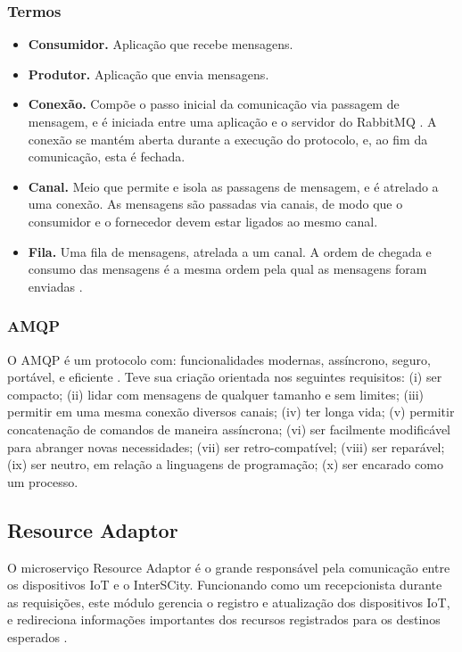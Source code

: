 \subsubsection{Termos}
\begin{itemize}
\item \textbf{Consumidor.} Aplicação que recebe mensagens.
\item \textbf{Produtor.} Aplicação que envia mensagens.
\item \textbf{Conexão.} Compõe o passo inicial da comunicação via passagem
de mensagem, e é iniciada entre uma aplicação e o servidor do
RabbitMQ \cite{amqp2008}. A conexão se mantém aberta durante a execução do
protocolo, e, ao fim da comunicação, esta é fechada.
\item \textbf{Canal.} Meio que permite e isola as passagens de mensagem, e é
atrelado a uma conexão. As mensagens são passadas via canais, de modo que
o consumidor e o fornecedor devem estar ligados ao mesmo canal.
\item \textbf{Fila.} Uma fila de mensagens, atrelada a um canal. A ordem de
chegada e consumo das mensagens é a mesma ordem pela qual as mensagens foram
enviadas \cite{amqp2008}.
\end{itemize}

\subsubsection{AMQP}

O AMQP é um protocolo com: funcionalidades modernas, assíncrono, seguro,
portável, e eficiente \cite{amqp2008}. Teve sua criação orientada nos seguintes
requisitos:
(i) ser compacto;
(ii) lidar com mensagens de qualquer tamanho e sem limites;
(iii) permitir em uma mesma conexão diversos canais;
(iv) ter longa vida;
(v) permitir concatenação de comandos de maneira assíncrona;
(vi) ser facilmente modificável para abranger novas necessidades;
(vii) ser retro-compatível;
(viii) ser reparável;
(ix) ser neutro, em relação a linguagens de programação;
(x) ser encarado como um processo.

\subsection{Resource Adaptor}

O microserviço Resource Adaptor é o grande responsável pela comunicação entre
os dispositivos IoT e o InterSCity. Funcionando como um recepcionista durante
as requisições, este módulo gerencia o registro e atualização dos dispositivos
IoT, e redireciona informações importantes dos recursos registrados para os
destinos esperados \cite{delesposte2017}.

